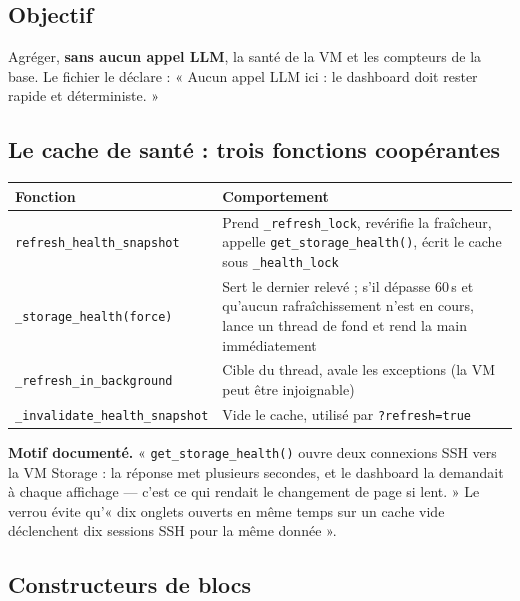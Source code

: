 \documentclass[11pt,a4paper]{report}
\newcommand{\fn}[1]{\texttt{\small\textcolor{oasisviolet}{#1}}}
\begin{document}
\subsection*{Objectif}
Agréger, \textbf{sans aucun appel LLM}, la santé de la VM et les compteurs de la
base. Le fichier le déclare : « Aucun appel LLM ici : le dashboard doit rester
rapide et déterministe. »

\subsection*{Le cache de santé : trois fonctions coopérantes}

\begin{longtable}{@{}p{4.6cm}p{10.2cm}@{}}
\toprule
\textbf{Fonction} & \textbf{Comportement}\\
\midrule
\endhead
\fn{refresh\_health\_snapshot} & Prend \fn{\_refresh\_lock}, revérifie la fraîcheur, appelle \fn{get\_storage\_health()}, écrit le cache sous \fn{\_health\_lock}\\
\fn{\_storage\_health(force)} & Sert le dernier relevé ; s'il dépasse 60\,s et qu'aucun rafraîchissement n'est en cours, lance un thread de fond et rend la main immédiatement\\
\fn{\_refresh\_in\_background} & Cible du thread, avale les exceptions (la VM peut être injoignable)\\
\fn{\_invalidate\_health\_snapshot} & Vide le cache, utilisé par \texttt{?refresh=true}\\
\bottomrule
\end{longtable}

\begin{infobox}
\textbf{Motif documenté.} « \fn{get\_storage\_health()} ouvre deux connexions SSH
vers la VM Storage : la réponse met plusieurs secondes, et le dashboard la
demandait à chaque affichage --- c'est ce qui rendait le changement de page si
lent. » Le verrou évite qu'« dix onglets ouverts en même temps sur un cache vide
déclenchent dix sessions SSH pour la même donnée ».
\end{infobox}

\subsection*{Constructeurs de blocs}
\end{document}
